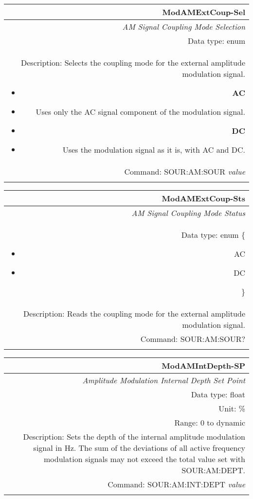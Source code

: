 \documentclass[openany]{article}
\begin{document}
		\begin{tabular}{N}
			\hline
			\bfseries ModAMExtCoup-Sel \\ \hline
			\emph{AM Signal Coupling Mode Selection} \\
			Data type: enum \\  
			Description: Selects the coupling mode for the external amplitude modulation signal.\begin{itemize}[noitemsep]
				\small
				\item[] \textbf{AC} 
				\item[]	Uses only the AC signal component of the modulation signal.
				\item[] \textbf{DC}
				\item[] Uses the modulation signal as it is, with AC and DC.
			\end{itemize} \\
			Command: SOUR:AM:SOUR \emph{value} \\
			\\

		\end{tabular}


		\begin{tabular}{N}
			\hline
			\bfseries ModAMExtCoup-Sts \\ \hline
			\emph{AM Signal Coupling Mode Status} \\
			Data type: enum \{\begin{itemize}[noitemsep]
				\small
				\item[] AC
				\item[] DC
			\end{itemize}\} \\ 
			Description: Reads the coupling mode for the external amplitude modulation signal. \\
			Command: SOUR:AM:SOUR? \\
			\\

		\end{tabular}


		\begin{tabular}{N}
			\hline
			\bfseries ModAMIntDepth-SP \\ \hline
			\emph{Amplitude Modulation Internal Depth Set Point} \\
			Data type: float \\
			Unit: \% \\
			Range: 0 to dynamic \\
			Description: Sets the depth of the internal amplitude modulation signal in Hz. The sum of the deviations of all active frequency modulation signals may not exceed the total value set with SOUR:AM:DEPT. \\
			Command: SOUR:AM:INT:DEPT \emph{value} \\
			\\
			
		\end{tabular}
\end{document}
